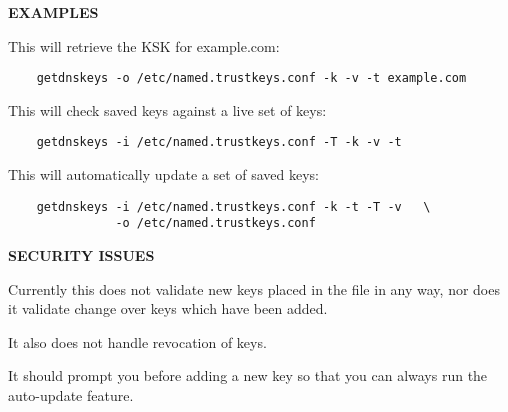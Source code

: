 {\bf EXAMPLES}

This  will retrieve the KSK for example.com:

\begin{verbatim}
    getdnskeys -o /etc/named.trustkeys.conf -k -v -t example.com
\end{verbatim}

This  will check saved keys against a live set of keys:

\begin{verbatim}
    getdnskeys -i /etc/named.trustkeys.conf -T -k -v -t
\end{verbatim}

This  will automatically update a set of saved keys:

\begin{verbatim}
    getdnskeys -i /etc/named.trustkeys.conf -k -t -T -v   \
               -o /etc/named.trustkeys.conf
\end{verbatim}

{\bf SECURITY ISSUES}

Currently this does not validate new keys placed in the file in any
way, nor does it validate change over keys which have been added.

It also does not handle revocation of keys.

It should prompt you before adding a new key so that you can always
run the auto-update feature.

